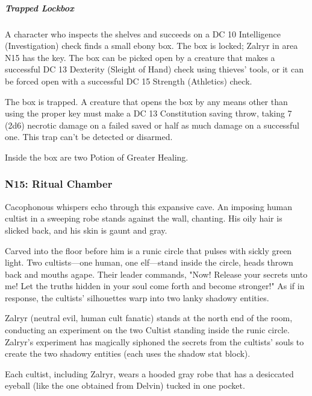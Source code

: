\documentclass[10pt,a4paper,twoside,bg=print,twocolumn,openany,nodeprecatedcode]{dndbook}
\begin{document}
\subparagraph{Trapped Lockbox}
A character who inspects the shelves and succeeds on a DC 10 Intelligence (Investigation) check finds a small ebony box. The box is locked; Zalryr in area N15 has the key. The box can be picked open by a creature that makes a successful DC 13 Dexterity (Sleight of Hand) check using thieves' tools, or it can be forced open with a successful DC 15 Strength (Athletics) check.

The box is trapped. A creature that opens the box by any means other than using the proper key must make a DC 13 Constitution saving throw, taking 7 (2d6) necrotic damage on a failed saved or half as much damage on a successful one. This trap can't be detected or disarmed.

Inside the box are two Potion of Greater Healing.
\subsubsection{N15: Ritual Chamber}
\begin{DndReadAloud}{}
Cacophonous whispers echo through this expansive cave. An imposing human cultist in a sweeping robe stands against the wall, chanting. His oily hair is slicked back, and his skin is gaunt and gray.

Carved into the floor before him is a runic circle that pulses with sickly green light. Two cultists—one human, one elf—stand inside the circle, heads thrown back and mouths agape. Their leader commands, "Now! Release your secrets unto me! Let the truths hidden in your soul come forth and become stronger!" As if in response, the cultists' silhouettes warp into two lanky shadowy entities.
\end{DndReadAloud}

Zalryr (neutral evil, human cult fanatic) stands at the north end of the room, conducting an experiment on the two Cultist standing inside the runic circle. Zalryr's experiment has magically siphoned the secrets from the cultists' souls to create the two shadowy entities (each uses the shadow stat block).

Each cultist, including Zalryr, wears a hooded gray robe that has a desiccated eyeball (like the one obtained from Delvin) tucked in one pocket.
\end{document}
